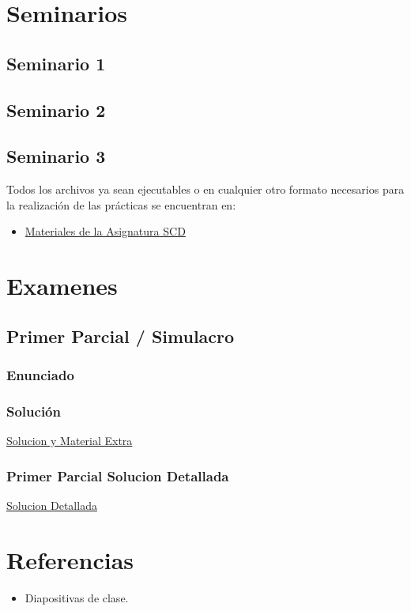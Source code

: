 \documentclass[a4paper,12pt]{article}
\begin{document}
\newpage
\section{Seminarios}
\subsection{Seminario 1}

\subsection{Seminario 2}

\subsection{Seminario 3}


Todos los archivos ya sean ejecutables o en cualquier otro formato necesarios para la realización de las prácticas se encuentran en:

\begin{itemize}
    \item \href{https://github.com/ElblogdeIsmael/ElblogdeIsmael.github.io/tree/main/Asignaturas/Tercer%20A%C3%B1o/SCD}{Materiales de la Asignatura SCD}

\end{itemize}

\section{Examenes}

\subsection{Primer Parcial / Simulacro}
\subsubsection{Enunciado}

\subsubsection{Solución}
\href{https://github.com/ElblogdeIsmael/ElblogdeIsmael.github.io/tree/main/Asignaturas/Tercer%20A%C3%B1o/SCD/Examenes}{Solucion y Material Extra}

\subsubsection{Primer Parcial Solucion Detallada}
\href{https://github.com/ElblogdeIsmael/ElblogdeIsmael.github.io/tree/main/Asignaturas/Tercer%20A%C3%B1o/SCD/Examenes/Parcial_SCD_Extra/ETSIIT/build/Parcial.pdf}{Solucion Detallada}



\section{Referencias}
\begin{itemize}
    \item Diapositivas de clase.
\end{itemize}
\end{document}
